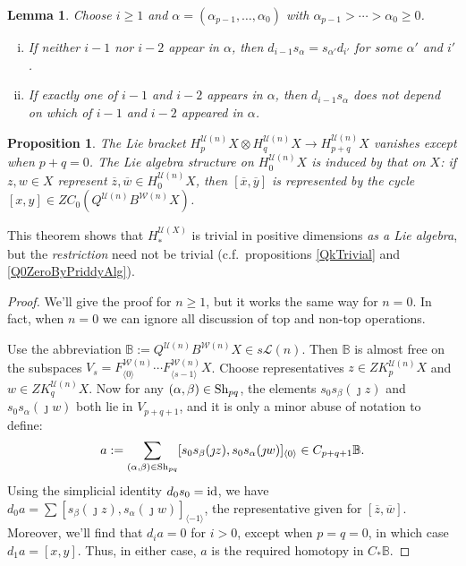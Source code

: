 \documentclass[11pt]{amsart}
\theoremstyle{plain}
\newtheorem{lem}[thm]{Lemma}
\newtheorem{prop}[thm]{Proposition}
\theoremstyle{definition}
\renewcommand{\to}{\longrightarrow}
\newcommand{\squishlist}{
  \setlength{\itemsep}{.5pt}
  \setlength{\parskip}{0pt}
  \setlength{\parsep}{0pt}}
\newcommand{\calW}{\mathcal{W}}
\newcommand{\calU}{\mathcal{U}}
\newcommand{\calL}{\mathcal{L}}
\theoremstyle{plain}
\newcommand{\Shuffles}[2]{\textup{Sh}_{#1#2}}
\newcommand{\Id}{\textup{id}}
\begin{document}
\begin{Koszul complexes}
\begin{lem}\label{LemmaOnSimplicialRelations}
Choose $i\geq1$ and $\alpha=(\alpha_{p-1},\ldots,\alpha_0)$ with $\alpha_{p-1}>\cdots >\alpha_0\geq0$.
\begin{enumerate}[i)]\squishlist
\setlength{\parindent}{.25in}
\item[i)] If neither $i-1$ nor $i-2$ appear in $\alpha$, then  $d_{i-1}s_\alpha=s_{\alpha'}d_{i'}$ for some $\alpha'$ and $i'$.
\item[ii)] If exactly one of $i-1$ and $i-2$ appears in $\alpha$, then  $d_{i-1}s_\alpha$ does not depend on which of $i-1$ and $i-2$ appeared in $\alpha$.
\end{enumerate}
\end{lem}

\begin{prop}\label{LieBracketsTrivial}
The Lie bracket $H_p^{\calU(n)}X\otimes H_q^{\calU(n)}X\to H_{p+q}^{\calU(n)}X$ vanishes except when $p+q=0$. 
The Lie algebra structure on $H_0^{\calU(n)}X$ is induced by that on $X$: if $z,w\in X$ represent $\overline{z},\overline{w}\in H_0^{\calU(n)}X$, then $[\overline{x},\overline{y}]$ is represented by the cycle $[x,y]\in ZC_0(Q^{\calU(n)}B^{\calW(n)}X)$.
\end{prop}
\noindent This theorem shows that $H_*^{\calU(X)}$ is trivial in positive dimensions \emph{as a Lie algebra}, but the \emph{restriction} need not be trivial (c.f.\ propositions \ref{QkTrivial} and \ref{Q0ZeroByPriddyAlg}).
\begin{proof}
We'll give the proof for $n\geq1$, but it works the same way for $n=0$. In fact, when $n=0$ we can ignore all discussion of top and non-top operations.

Use the abbreviation $\mathbb{B}:=Q^{\calU(n)}B^{\calW(n)}X\in s\calL(n)$. Then $\mathbb{B}$ is almost free on the subspaces $V_s=F^{\calW(n)}_{\langle 0\rangle}\cdots F^{\calW(n)}_{\langle s-1\rangle}X$. Choose representatives $z\in ZK_p^{\calU(n)}X$ and $w\in ZK_q^{\calU(n)}X$. Now  for any $(\alpha,\beta)\in\Shuffles{p}{q}$, the elements $s_{0}s_\beta(\jmath z)$ and $s_{0}s_\alpha(\jmath w)$ both lie in $V_{p+q+1}$, and it is only a minor abuse of notation to define:
\[a:=\sum_{(\alpha,\beta)\in\Shuffles{p}{q}}[s_{0}s_\beta(\jmath z), s_{0}s_\alpha(\jmath w)]_{\langle 0\rangle}\in C_{p+q+1}\mathbb{B}.\]
Using the simplicial identity $d_0s_0=\Id$, we have $d_{0}a=\sum [s_\beta(\jmath z), s_\alpha(\jmath w)]_{\langle -1\rangle}$, the representative given for $[\overline{z},\overline{w}]$. Moreover, we'll find that $d_ia=0$ for $i>0$, except when $p=q=0$, in which case $d_1a=[x,y]$. Thus, in either case, $a$ is the required homotopy in $C_*\mathbb{B}$.


\end{proof}
\end{Koszul complexes}
\end{document}
